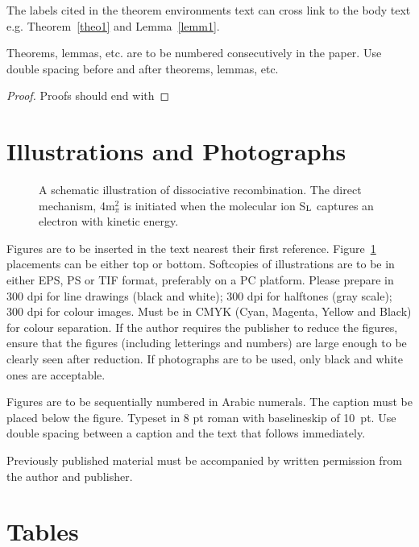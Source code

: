 \documentclass{ws-ijcga}
\begin{document}
The labels cited in the theorem environments text can 
cross link to the body text e.g. Theorem~\ref{theo1} 
and Lemma~\ref{lemm1}.

\begin{lemma}  \label{lemm1}
Theorems, lemmas, etc. are to be numbered consecutively in the
paper. Use double spacing before and after theorems, lemmas, etc.
\end{lemma}

\begin{proof}
Proofs should end with
\end{proof}

\section{Illustrations and Photographs}

\begin{figure}[b]
\centerline{}
\vspace*{8pt}
\caption{A schematic illustration of dissociative recombination. The
direct mechanism, 4m$^2_\pi$ is initiated when the
molecular ion S$_{\rm L}$ captures an electron with 
kinetic energy. \label{fig1}}
\end{figure}

Figures are to be inserted in the text nearest their first
reference.  Figure~\ref{fig1} placements can be either top or 
bottom. Softcopies of illustrations are to be in either EPS, PS
or TIF format, preferably on a PC platform. Please prepare in 
300 dpi for line drawings (black and white); 
300 dpi for halftones (gray scale); 
300 dpi for colour images. Must be in CMYK (Cyan, Magenta,
Yellow and Black) for colour separation. If the author requires the
publisher to reduce the figures, ensure that the figures (including
letterings and numbers) are large enough to be clearly seen after
reduction. If photographs are to be used, only black and white ones 
are acceptable.

Figures are to be sequentially numbered in Arabic numerals. The
caption must be placed below the figure. Typeset in 8 pt roman
with baselineskip of 10~pt. Use double spacing between a
caption and the text that follows immediately.

Previously published material must be accompanied by written
permission from the author and publisher.

\section{Tables}
\end{document}
